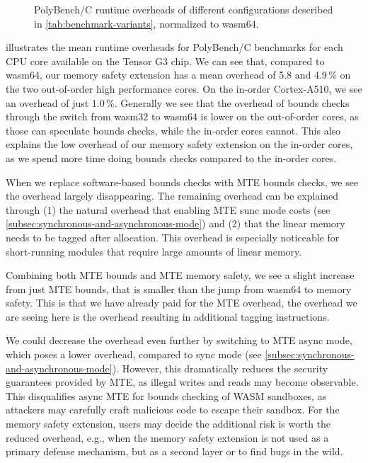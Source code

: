 \begin{figure}[ht]
    \centering
    
    \caption{PolyBench/C runtime overheads of different configurations described in \cref{tab:benchmark-variants}, normalized to wasm64.}
    \label{fig:runtime-overheads-combined}
\end{figure}

 illustrates the mean runtime overheads for PolyBench/C benchmarks for each CPU core available on the Tensor G3 chip.
We can see that, compared to wasm64, our memory safety extension has a mean overhead of 5.8 and 4.9\,\% on the two out-of-order high performance cores.
On the in-order Cortex-A510, we see an overhead of just 1.0\,\%.
Generally we see that the overhead of bounds checks through the switch from wasm32 to wasm64 is lower on the out-of-order cores, as those can speculate bounds checks, while the in-order cores cannot.
This also explains the low overhead of our memory safety extension on the in-order cores, as we spend more time doing bounds checks compared to the in-order cores.

When we replace software-based bounds checks with \ac{MTE} bounds checks, we see the overhead largely disappearing.
The remaining overhead can be explained through (1) the natural overhead that enabling \ac{MTE} sunc mode costs (see \cref{subsec:synchronous-and-asynchronous-mode}) and (2) that the linear memory needs to be tagged after allocation.
This overhead is especially noticeable for short-running modules that require large amounts of linear memory.

Combining both \ac{MTE} bounds and \ac{MTE} memory safety, we see a slight increase from just \ac{MTE} bounds, that is smaller than the jump from wasm64 to memory safety.
This is that we have already paid for the \ac{MTE} overhead, the overhead we are seeing here is the overhead resulting in additional tagging instructions.

We could decrease the overhead even further by switching to \ac{MTE} async mode, which poses a lower overhead, compared to sync mode (see \cref{subsec:synchronous-and-asynchronous-mode}).
However, this dramatically reduces the security guarantees provided by \ac{MTE}, as illegal writes and reads may become observable.
This disqualifies async \ac{MTE} for bounds checking of \ac{WASM} sandboxes, as attackers may carefully craft malicious code to escape their sandbox.
For the memory safety extension, users may decide the additional risk is worth the reduced overhead, e.g., when the memory safety extension is not used as a primary defense mechanism, but as a second layer or to find bugs in the wild.

